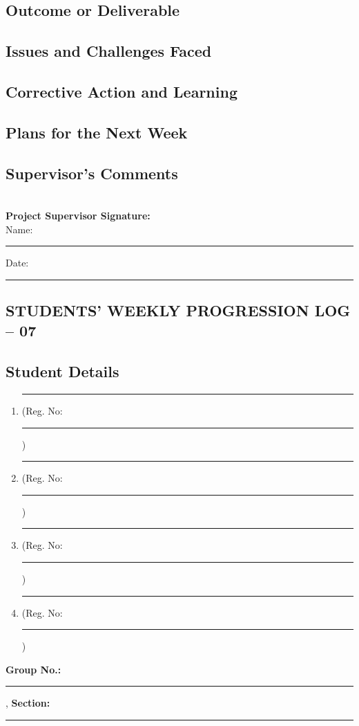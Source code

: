 \documentclass[a4paper]{article}
\begin{document}
\subsection*{Outcome or Deliverable}
\framebox[\textwidth][c]{\rule{0pt}{4cm}}


\subsection*{Issues and Challenges Faced}
\framebox[\textwidth][c]{\rule{0pt}{4cm}}


\subsection*{Corrective Action and Learning}
\framebox[\textwidth][c]{\rule{0pt}{4cm}}


\subsection*{Plans for the Next Week}
\framebox[\textwidth][c]{\rule{0pt}{4cm}}

\subsection*{Supervisor's Comments}
\framebox[\textwidth][c]{\rule{0pt}{4cm}}\\[2em]

\vfill
\textbf{Project Supervisor Signature:}\\[1em]
Name: \rule{6cm}{0.4pt} \hfill Date: \rule{4cm}{0.4pt}

\newpage
\begin{center}
\section*{STUDENTS' WEEKLY PROGRESSION LOG -- 07}
\end{center}
\subsection*{Student Details}
\begin{enumerate}[itemsep=0em]
\item \rule{8cm}{0.4pt} (Reg. No:\rule{2cm}{0.4pt})
\item \rule{8cm}{0.4pt} (Reg. No:\rule{2cm}{0.4pt})
\item \rule{8cm}{0.4pt} (Reg. No:\rule{2cm}{0.4pt})
\item \rule{8cm}{0.4pt} (Reg. No:\rule{2cm}{0.4pt})
\end{enumerate}
\textbf{Group No.:} \rule{4cm}{0.4pt}, \textbf{Section:} \rule{3.5cm}{0.4pt}
\end{document}
